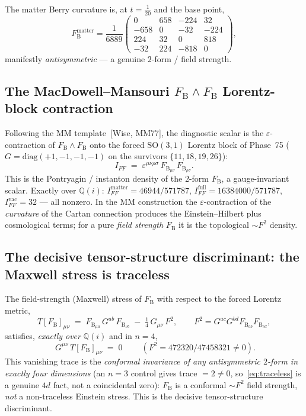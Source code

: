 \documentclass[11pt]{article}
\newcommand{\SO}{\mathrm{SO}}
\newcommand{\FB}{F_{\mathrm{B}}}
\theoremstyle{plain}
\theoremstyle{definition}
\begin{document}
The matter Berry curvature is, at $t=\tfrac1{20}$ and the base point,
\begin{equation}
  \FB^{\mathrm{matter}}=\frac{1}{6889}
  \begin{pmatrix}
    0 & 658 & -224 & 32\\
   -658 & 0 & -32 & -224\\
    224 & 32 & 0 & 818\\
   -32 & 224 & -818 & 0
  \end{pmatrix},
  \label{eq:FBmatter}
\end{equation}
manifestly \emph{antisymmetric} --- a genuine $2$-form / field strength.

\subsection{The MacDowell--Mansouri $\FB\wedge\FB$ Lorentz-block contraction}

Following the MM template~[Wise, MM77], the diagnostic scalar is the
$\varepsilon$-contraction of $\FB\wedge\FB$ onto the forced $\SO(3,1)$ Lorentz block of
Phase~75 ($G=\mathrm{diag}(+1,-1,-1,-1)$ on the survivors $\{11,18,19,26\}$):
\begin{equation}
  I_{FF} \;=\; \varepsilon^{\mu\nu\rho\sigma}\,\FB_{\mu\nu}\,\FB_{\rho\sigma}.
  \label{eq:IFF}
\end{equation}
This is the Pontryagin / instanton density of the $2$-form $\FB$, a gauge-invariant
scalar. Exactly over $\mathbb{Q}(i)$: $I_{FF}^{\mathrm{matter}}=46944/571787$,
$I_{FF}^{\mathrm{full}}=16384000/571787$, $I_{FF}^{\mathrm{vac}}=32$ --- all nonzero. In
the MM construction the $\varepsilon$-contraction of the \emph{curvature} of the Cartan
connection produces the Einstein--Hilbert plus cosmological terms; for a pure
\emph{field strength} $\FB$ it is the topological $\sim F^2$ density.

\subsection{The decisive tensor-structure discriminant: the Maxwell stress is traceless}

The field-strength (Maxwell) stress of $\FB$ with respect to the forced Lorentz metric,
\begin{equation}
  T[\FB]_{\mu\nu} \;=\; \FB_{\mu a}\,G^{ab}\,\FB_{\nu b}
    \;-\; \tfrac14\,G_{\mu\nu}\,F^2,\qquad
  F^2 = G^{ac}G^{bd}\FB_{ab}\FB_{cd},
  \label{eq:maxwell}
\end{equation}
satisfies, \emph{exactly over} $\mathbb{Q}(i)$ and in $n=4$,
\begin{equation}
  \boxed{\;G^{\mu\nu}\,T[\FB]_{\mu\nu} \;=\; 0\;}
  \qquad(F^2 = 472320/47458321\neq0).
  \label{eq:traceless}
\end{equation}
This vanishing trace is the \emph{conformal invariance of any antisymmetric $2$-form in
exactly four dimensions} (an $n=3$ control gives trace $=2\neq0$, so~\eqref{eq:traceless}
is a genuine $4d$ fact, not a coincidental zero): $\FB$ is a conformal $\sim F^2$ field
strength, \emph{not} a non-traceless Einstein stress. This is the decisive
tensor-structure discriminant.
\end{document}
